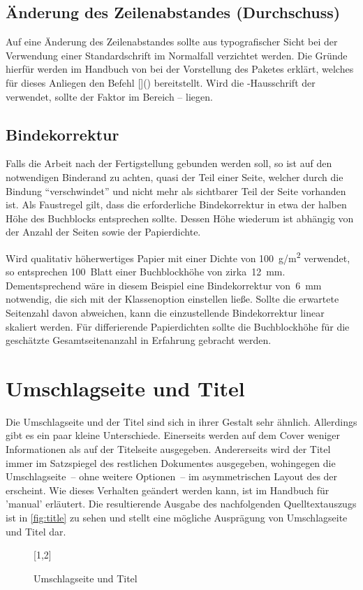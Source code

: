 \documentclass[%
  english,ngerman,%
  cdgeometry=no,DIV=12,%
  cd=false,cdfont=false,cdtitle=true,%
  headings=normal,%
  automark,%
  listof=toc,%
]{tudscrartcl}
\begin{document}
\subsection{Änderung des Zeilenabstandes (Durchschuss)}
Auf eine Änderung des Zeilenabstandes sollte aus typografischer Sicht bei der 
Verwendung einer Standardschrift im Normalfall verzichtet werden. Die Gründe 
hierfür werden im Handbuch von \TUDScript bei der Vorstellung des Paketes 
 erklärt, welches für dieses Anliegen den Befehl 
[]() bereitstellt. Wird 
die \OpenSans-Hausschrift der \TnUD verwendet, sollte der Faktor im Bereich 
-- liegen.

\subsection{Bindekorrektur}
\label{sec:bcor}%
%
Falls die Arbeit nach der Fertigstellung gebunden werden soll, so ist auf den 
notwendigen Binderand zu achten, quasi der Teil einer Seite, welcher durch die 
Bindung \enquote{verschwindet} und nicht mehr als sichtbarer Teil der Seite 
vorhanden ist. Als Faustregel gilt, dass die erforderliche Bindekorrektur in 
etwa der halben Höhe des Buchblocks entsprechen sollte. Dessen Höhe wiederum 
ist abhängig von der Anzahl der Seiten sowie der Papierdichte.

Wird qualitativ höherwertiges Papier mit einer Dichte von \SI{100}{g/m^2} 
verwendet, so entsprechen 100~Blatt einer Buchblockhöhe von zirka~\SI{12}{mm}. 
Dementsprechend wäre in diesem Beispiel eine Bindekorrektur von~\SI{6}{mm} 
notwendig, die sich mit der Klassenoption  einstellen ließe. 
Sollte die erwartete Seitenzahl davon abweichen, kann die einzustellende 
Bindekorrektur linear skaliert werden. Für differierende Papierdichten sollte 
die Buchblockhöhe für die geschätzte Gesamtseitenanzahl in Erfahrung gebracht 
werden.



\section{Umschlagseite und Titel}
Die Umschlagseite und der Titel sind sich in ihrer Gestalt sehr ähnlich. 
Allerdings gibt es ein paar kleine Unterschiede. Einerseits werden auf dem 
Cover weniger Informationen als auf der Titelseite ausgegeben. Andererseits 
wird der Titel immer im Satzspiegel des restlichen Dokumentes ausgegeben, 
wohingegen die Umschlagseite~-- ohne weitere Optionen~-- im asymmetrischen 
Layout des \CDs der \TnUD erscheint. Wie dieses Verhalten geändert werden kann, 
ist im Handbuch für 'manual' erläutert. Die resultierende 
Ausgabe des nachfolgenden Quelltextauszugs ist in \autoref{fig:title} zu sehen 
und stellt eine mögliche Ausprägung von Umschlagseite und Titel dar.
%
\begin{figure}
[1,2]
\caption{Umschlagseite und Titel}
\label{fig:title}
\end{figure}
\end{document}
